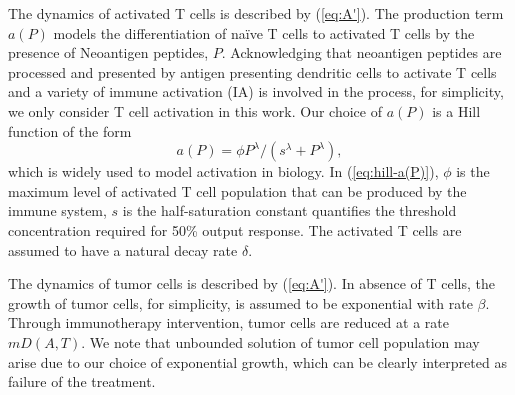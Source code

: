 \documentclass[review,authoryear]{elsarticle}
\begin{document}
The dynamics of activated T cells is described by (\ref{eq:A'}). The production term $a(P)$ models the differentiation of na\"ive T cells to activated T cells by the presence of Neoantigen peptides, $P$. Acknowledging that neoantigen peptides are processed and presented by antigen presenting dendritic cells to activate T cells and a variety of immune activation (IA) is involved in the process, for simplicity, we only consider T cell activation in this work. Our choice of $a(P)$ is a Hill function of the form   
\begin{equation} \label{eq:hill-a(P)}
a(P)=\phi P^{\lambda}/(s^{\lambda}+P^{\lambda}), 
\end{equation}
which is widely used to model activation in biology\citep{Somvanshi2013}. In (\ref{eq:hill-a(P)}), $\phi$ is the maximum level of activated T cell population that can be produced by the immune system, $s$ is the half-saturation constant quantifies the threshold concentration required for 50\% output response. The activated T cells are assumed to have a natural decay rate $\delta$.

The dynamics of tumor cells is described by (\ref{eq:A'}). In absence of T cells, the growth of tumor cells, for simplicity, is assumed to be exponential with rate $\beta$. Through immunotherapy intervention, tumor cells are reduced at a rate $mD(A,T)$. We note that unbounded solution of tumor cell population may arise due to our choice of exponential growth, which can be clearly interpreted as failure of the treatment. 
\end{document}
